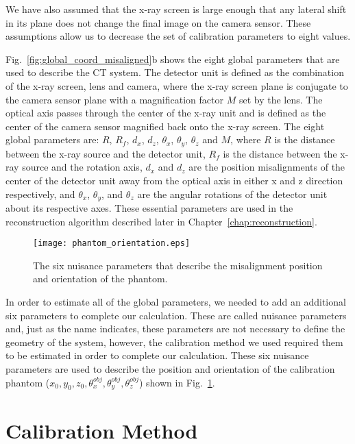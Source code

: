 We have also assumed that the x-ray screen is large enough that any lateral shift in its plane does not change the final image on the camera sensor.  These assumptions allow us to decrease the set of calibration parameters to eight values.

Fig.~\ref{fig:global_coord_misaligned}b shows the eight global parameters that are used to describe the CT system.  The detector unit is defined as the combination of the x-ray screen, lens and camera, where the x-ray screen plane is conjugate to the camera sensor plane with a magnification factor $M$ set by the lens.  The optical axis passes through the center of the x-ray unit and is defined as the center of the camera sensor magnified back onto the x-ray screen.  The eight global parameters are: $R$, $R_f$, $d_x$, $d_z$, $\theta_x$, $\theta_y$, $\theta_z$ and $M$, where $R$ is the distance between the x-ray source and the detector unit, $R_f$ is the distance between the x-ray source and the rotation axis, $d_x$ and $d_z$ are the position misalignments of the center of the detector unit away from the optical axis in either x and z direction respectively, and $\theta_x$, $\theta_y$, and $\theta_z$ are the angular rotations of the detector unit about its respective axes.  These essential parameters are used in the reconstruction algorithm described later in Chapter~\ref{chap:reconstruction}.

\begin{figure}[h]
\begin{minipage}{\linewidth}
\centering
\texttt{[image: phantom\_orientation.eps]}
\end{minipage}
\caption{The six nuisance parameters that describe the misalignment position and orientation of the phantom.}
\label{fig:phantom_orientation}
\end{figure}

In order to estimate all of the global parameters, we needed to add an additional six parameters to complete our calculation.  These are called nuisance parameters and, just as the name indicates, these parameters are not necessary to define the geometry of the system, however, the calibration method we used required them to be estimated in order to complete our calculation.  These six nuisance parameters are used to describe the position and orientation of the calibration phantom ($x_0, y_0, z_0, \theta^{obj}_x, \theta_y^{obj}, \theta_z^{obj}$) shown in Fig.~\ref{fig:phantom_orientation}.  

\section{Calibration Method}
\label{section:calibration_method}

